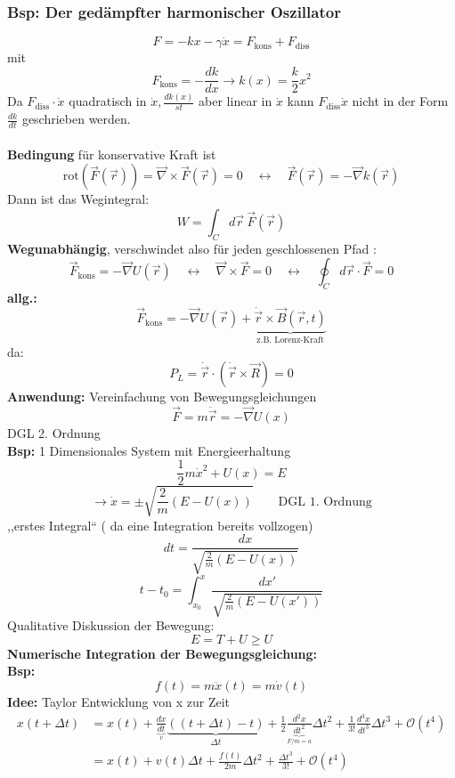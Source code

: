 \documentclass[titlepage,12pt,a4paper,ngerman]{report}
\newcommand{\tx}[1]{\textrm{#1}}
\newcommand{\ub}[1]{\underbrace{#1}}
\begin{document}
\subsubsection{Bsp: Der gedämpfter harmonischer Oszillator}
$$ F = -kx - \gamma \dot{x} = F_{\tx{kons}} + F_{\tx{diss}}$$
mit
$$F_{\tx{kons}} = -\frac{dk}{dx} \rightarrow k(x) = \frac{k}{2} x^2$$
Da $F_{\tx{diss}} \cdot \dot{x}$ quadratisch in $\dot{x} , \frac{dk(x)}{st}$ aber linear in $\dot{x}$ kann $F_{\tx{diss}} \dot{x}$ nicht in der Form $\frac{dk}{dt}$ geschrieben werden.\\\\
\textbf{Bedingung} für konservative Kraft ist
$$ \tx{rot}(\vec{F}(\vec{r})) = \vec{\nabla} \times \vec{F}(\vec{r}) = 0 \quad \leftrightarrow \quad \vec{F}(\vec{r}) = -\vec{\nabla} k(\vec{r})$$
Dann ist das Wegintegral:
$$ W = \int_C d\vec{r}\  \vec{F} (\vec{r})$$
\textbf{Wegunabhängig}, verschwindet also für jeden geschlossenen Pfad :
$$ \vec{F}_{\tx{kons}} = -\vec{\nabla} U(\vec{r}) \quad \leftrightarrow  \quad \vec{\nabla} \times \vec{F} = 0 \quad \leftrightarrow \quad  \oint_C d\vec{r} \cdot \vec{F}= 0$$
\textbf{allg.:} 
$$ \vec{F}_{\tx{kons}} = - \vec{\nabla} U(\vec{r}) + \ub{ \dot{\vec{r}} \times \vec{B} (\vec{r} , t) } _{\tx{z.B. Lorenz-Kraft}}$$
da:
$$P_L = \dot{\vec{r}} \cdot (\dot{\vec{r}} \times \vec{R} ) = 0$$
\textbf{Anwendung:} Vereinfachung von Bewegungsgleichungen
$$\vec{F} = m \ddot{\vec{r}} = - \vec{\nabla} U (x)$$
DGL 2. Ordnung\\
\textbf{Bsp:} 1 Dimensionales System mit Energieerhaltung
$$ \frac{1}{2} m \dot{x}^2 + U(x) = E$$
$$\rightarrow \dot{x} = \pm \sqrt{\frac{2}{m}(E -U(x))} \qquad \textrm{DGL 1. Ordnung}$$
,,erstes Integral`` ( da eine Integration bereits vollzogen)
$$ dt = \frac{dx}{\sqrt{\frac{2}{m} (E-U(x))}}$$
$$ t-t_0 = \int_{x_0}^x \frac{dx'}{\sqrt{\frac{2}{m} (E-U(x'))}}$$
Qualitative Diskussion der Bewegung:\\
$$E=T+U\ge U$$
\textbf{Numerische Integration der Bewegungsgleichung:}\\
\textbf{Bsp:} $$f(t) = m \ddot{x}(t) = m \dot{v}(t)$$
\textbf{Idee:} Taylor Entwicklung von x zur Zeit 
\begin{align*}
x(t+\Delta t) &= x(t) + \frac{dx}{\underbrace{dt}_{v}} \underbrace{((t+\Delta t) -t)}_{\Delta t} + \frac{1}{2} \frac{d^2x}{\underbrace{dt^2}_{F/m = a}} \Delta t^2 + \frac{1}{3!} \frac{d^3x}{dt^3} \Delta t^3 + \mathcal{O}(t^4)\\
&= x(t) + v(t) \Delta t + \frac{f(t)}{2m} \Delta t^2 + \frac{\Delta t^3}{3!} + \mathcal{O}(t^4)
\end{align*}
\end{document}
